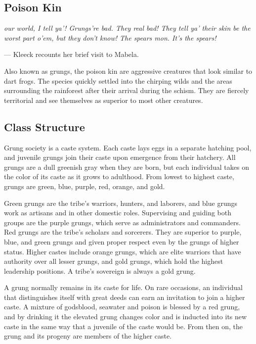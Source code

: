 \begin{linenumbers}

\section{Poison Kin}
\textit{ our world, I tell ya'!
Grungs're bad.
They real bad!
They tell ya' their skin be the worst part o'em, but they don't know!
The spears mon.
It's the spears!}

\hspace*{\fill} --- Kleeck recounts her brief visit to Mabela.

Also known as grungs, the poison kin are aggressive creatures that look similar to dart frogs.
The species quickly settled into the chirping wilds and the areas surrounding the rainforest after their arrival during the schism.
They are fiercely territorial and see themselves as superior to most other creatures.

\subsection*{Class Structure}
Grung society is a caste system.
Each caste lays eggs in a separate hatching pool, and juvenile grungs join their caste upon emergence from their hatchery.
All grungs are a dull greenish gray when they are born, but each individual takes on the color of its caste as it grows to adulthood.
From lowest to highest caste, grungs are green, blue, purple, red, orange, and gold.

Green grungs are the tribe's warriors, hunters, and laborers, and blue grungs work as artisans and in other domestic roles.
Supervising and guiding both groups are the purple grungs, which serve as administrators and commanders.
Red grungs are the tribe's scholars and sorcerers.
They are superior to purple, blue, and green grungs and given proper respect even by the grungs of higher status.
Higher castes include orange grungs, which are elite warriors that have authority over all lesser grungs, and gold grungs, which hold the highest leadership positions.
A tribe's sovereign is always a gold grung.

A grung normally remains in its caste for life.
On rare occasions, an individual that distinguishes itself with great deeds can earn an invitation to join a higher caste.
A mixture of godsblood, seawater and poison is blessed by a red grung, and by drinking it the elevated grung changes color and is inducted into its new caste in the same way that a juvenile of the caste would be.
From then on, the grung and its progeny are members of the higher caste.


\end{linenumbers}
